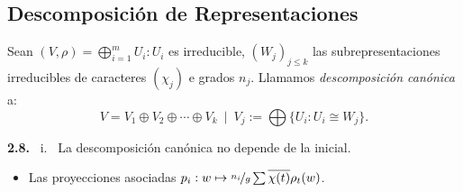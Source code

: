 \subsection*{Descomposición de Representaciones}

Sean \((V, \rho) = \bigoplus^m_{i=1} U_i : U_i\) es irreducible, \((W_j)_{j\leq k }\) las subrepresentaciones irreducibles de caracteres \((\chi_j)\) e grados \(n_j\). Llamamos \emph{descomposición canónica} a: 
\[V = V_1 \oplus V_2 \oplus \cdots\oplus V_k \ \mid \  V_j := \bigoplus\{ U_i  : U_i \cong W_j\}.\]

\begin{theorem}
    \textbf{2.8.} \ i. \ La descomposición canónica no depende de la inicial. %
    \vspace{-0.4cm}
    \begin{itemize}[left = 1cm]
        \item[ii.] Las proyecciones asociadas \(p_i : w \mapsto \nicefrac{n_i}{g} \sum   \overline{\chi(t)} \rho_t(w) \). 
    \end{itemize}
\end{theorem}
